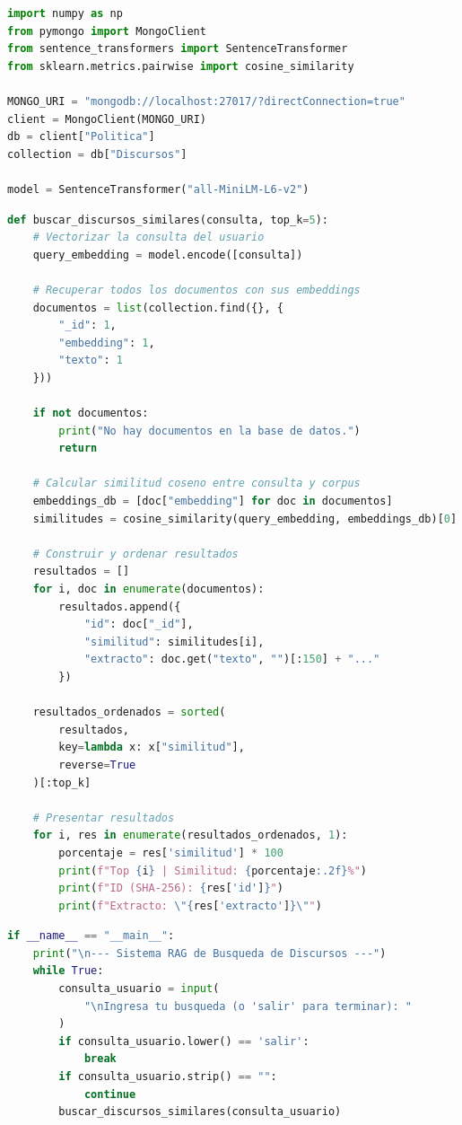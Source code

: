 \documentclass[12pt,a4paper]{article}
\begin{document}
\begin{lstlisting}[style=pythonstyle, language=Python,
    caption={Conexión y carga del modelo para búsqueda},
    label={lst:busqueda-init}]
import numpy as np
from pymongo import MongoClient
from sentence_transformers import SentenceTransformer
from sklearn.metrics.pairwise import cosine_similarity

MONGO_URI = "mongodb://localhost:27017/?directConnection=true"
client = MongoClient(MONGO_URI)
db = client["Politica"]
collection = db["Discursos"]

model = SentenceTransformer("all-MiniLM-L6-v2")
\end{lstlisting}

\begin{lstlisting}[style=pythonstyle, language=Python,
    caption={Función principal de búsqueda por similitud coseno},
    label={lst:busqueda-func}]
def buscar_discursos_similares(consulta, top_k=5):
    # Vectorizar la consulta del usuario
    query_embedding = model.encode([consulta])

    # Recuperar todos los documentos con sus embeddings
    documentos = list(collection.find({}, {
        "_id": 1,
        "embedding": 1,
        "texto": 1
    }))

    if not documentos:
        print("No hay documentos en la base de datos.")
        return

    # Calcular similitud coseno entre consulta y corpus
    embeddings_db = [doc["embedding"] for doc in documentos]
    similitudes = cosine_similarity(query_embedding, embeddings_db)[0]

    # Construir y ordenar resultados
    resultados = []
    for i, doc in enumerate(documentos):
        resultados.append({
            "id": doc["_id"],
            "similitud": similitudes[i],
            "extracto": doc.get("texto", "")[:150] + "..."
        })

    resultados_ordenados = sorted(
        resultados,
        key=lambda x: x["similitud"],
        reverse=True
    )[:top_k]

    # Presentar resultados
    for i, res in enumerate(resultados_ordenados, 1):
        porcentaje = res['similitud'] * 100
        print(f"Top {i} | Similitud: {porcentaje:.2f}%")
        print(f"ID (SHA-256): {res['id']}")
        print(f"Extracto: \"{res['extracto']}\"")
\end{lstlisting}

\begin{lstlisting}[style=pythonstyle, language=Python,
    caption={Bucle interactivo de consultas},
    label={lst:busqueda-main}]
if __name__ == "__main__":
    print("\n--- Sistema RAG de Busqueda de Discursos ---")
    while True:
        consulta_usuario = input(
            "\nIngresa tu busqueda (o 'salir' para terminar): "
        )
        if consulta_usuario.lower() == 'salir':
            break
        if consulta_usuario.strip() == "":
            continue
        buscar_discursos_similares(consulta_usuario)
\end{lstlisting}
\end{document}
